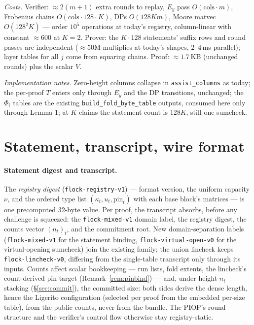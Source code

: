 \documentclass[11pt]{article}
\newcommand{\code}[1]{\texttt{#1}}
\theoremstyle{definition}
\begin{document}
\emph{Costs.} Verifier: $\approx 2(m{+}1)$ extra rounds to replay,
$E_y$ pass $O(\mathrm{cols} \cdot m)$, Frobenius chains
$O(\mathrm{cols} \cdot 128 \cdot K)$, DPs $O(128 K m)$, Moore matvec
$O(128^2 K)$ --- order $10^5$ operations at today's registry,
column-linear with constant $\approx 600$ at $K = 2$. Prover: the
$K \cdot 128$ statements' suffix rows and round passes are independent
($\approx 50$M multiplies at today's shapes, $2$--$4$\,ms parallel);
layer tables for all $j$ come from squaring chains. Proof:
$\approx 1.7$\,KB (unchanged rounds) plus the scalar $V$.

\emph{Implementation notes.} Zero-height columns collapse in
\code{assist\_columns} as today; the per-proof $T$ enters only through
$E_y$ and the DP transitions, unchanged; the $\Phi_i$ tables are the
existing \code{build\_fold\_byte\_table} outputs, consumed here only
through Lemma 1; at $K$ claims the statement count is $128K$, still
one sumcheck.

\section{Statement, transcript, wire format}\label{sec:statement}

\paragraph{Statement digest and transcript.} The \emph{registry digest}
(\code{flock-registry-v1}) --- format version, the uniform capacity $\nu$,
and the ordered type list $(\kappa_t, u_t, \text{pin}_t)$ with each base
block's matrices --- is one precomputed 32-byte value. Per proof, the
transcript absorbs, before any challenge is squeezed: the
\code{flock-mixed-v1} domain label, the registry digest, the counts vector
$(n_t)_t$, and the commitment root. New domain-separation labels
(\code{flock-mixed-v1} for the statement binding,
\code{flock-virtual-open-v0} for the virtual-opening sumcheck) join the
existing family; the union lincheck keeps \code{flock-lincheck-v0},
differing from the single-table transcript only through its inputs.
Counts affect scalar bookkeeping --- run lists, fold extents, the
lincheck's count-derived pin target (Remark~\ref{rem:pinbind}) --- and,
under height-$n_t$ stacking (\S\ref{sec:commit}), the committed size:
both sides derive the dense length, hence the Ligerito configuration
(selected per proof from the embedded per-size table), from the public
counts, never from the bundle. The PIOP's round structure and the
verifier's control flow otherwise stay registry-static.
\end{document}
